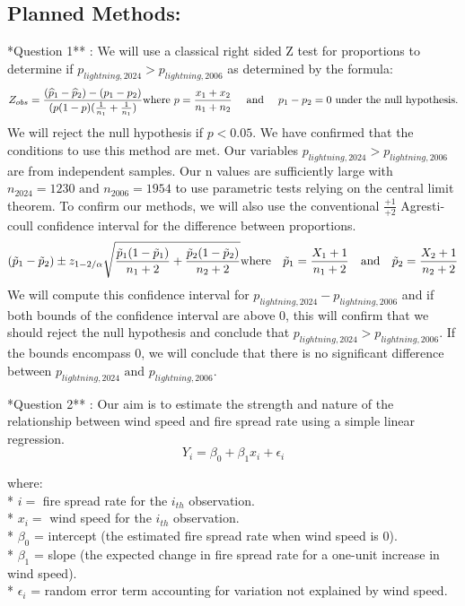 \documentclass[
]{article}
\begin{document}
\subsection{Planned Methods:}\label{planned-methods}

\indent **Question 1** : We will use a classical right sided Z test for
proportions to determine if
\(p_{lightning, 2024} > p_{lightning, 2006}\) as determined by the
formula: \[
Z_{obs}=\frac{(\widehat{p}_{1}-\widehat{p}_{2})-(p_{1}-p_{2})}{(p(1-p)(\frac{1}{n_{1}}+\frac{1}{n_{1}})}   \\
\text{where }   p=\frac{x_{1}+x_{2}}{n_{1} + n_{2}}  \quad
\text{  and }\quad p_{1}-p_{2} = 0  \text{ under the null hypothesis.}
\] We will reject the null hypothesis if \(p < 0.05\). We have confirmed
that the conditions to use this method are met. Our variables
\(p_{lightning, 2024} > p_{lightning, 2006}\) are from independent
samples. Our n values are sufficiently large with
\(n_{2024} = 1230 \text{ and } n_{2006} = 1954\) to use parametric tests
relying on the central limit theorem. To confirm our methods, we will
also use the conventional \(\frac{+1}{+2}\) Agresti-coull confidence
interval for the difference between proportions. \[
(\tilde{p}_{1}- \tilde{p}_{2}) \space\pm\space
z_{1-2/\alpha}
\sqrt{\frac{\tilde{p}_{1}(1-\tilde{p}_{1})}{n_{1}+2}+\frac{\tilde{p}_{2}(1-\tilde{p}_{2})}{n_{2} + 2}} \\
\text{where}\quad   \tilde{p}_{1} = \frac{X_{1}+1}{n_1+2}  \quad\text{and}\quad    \tilde{p}_{2} =\frac{ X_{2}+1}{n_2+2}
\] We will compute this confidence interval for
\(p_{lightning, 2024} - p_{lightning, 2006}\) and if both bounds of the
confidence interval are above 0, this will confirm that we should reject
the null hypothesis and conclude that
\(p_{lightning, 2024}  > p_{lightning, 2006}\). If the bounds encompass
0, we will conclude that there is no significant difference between
\(p_{lightning, 2024}  \text{ and } p_{lightning, 2006}\).

\indent **Question 2** : Our aim is to estimate the strength and nature
of the relationship between wind speed and fire spread rate using a
simple linear regression. \[
Y_{i} = \beta_{0} + \beta_{1}x_{i} + \epsilon_{i}
\]

\begin{flushleft}
where: \\
* $i =$ fire spread rate for the $i_{th}$ observation. \\
* $x_{i} =$ wind speed for the $i_{th}$ observation. \\
* $\beta_{0}$ = intercept (the estimated fire spread rate when wind speed is 0). \\
* $\beta_{1}$ = slope (the expected change in fire spread rate for a one-unit increase in wind speed). \\
* $\epsilon_{i}$ = random error term accounting for variation not explained by wind speed.
\end{flushleft}
\end{document}
